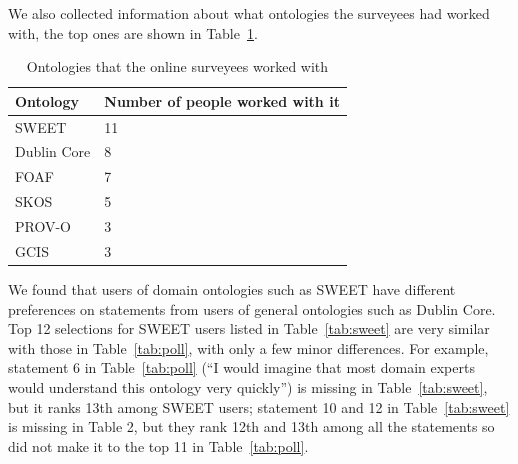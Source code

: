 We also collected information about what ontologies the surveyees had worked with, the top ones are shown in Table~\ref{tab:ontologies}.
\begin{table}
	\centering
\caption{Ontologies that the online surveyees worked with}
\label{tab:ontologies}
\begin{tabular}{|l|l|}
	\hline Ontology & Number of people worked with it \\ 
	\hline SWEET & 11 \\ 
	\hline Dublin Core & 8 \\ 
	\hline FOAF & 7 \\ 
	\hline SKOS & 5 \\ 
	\hline PROV-O & 3 \\ 
	\hline GCIS & 3 \\ 
	\hline 
\end{tabular} 
\end{table}
We found that users of domain ontologies such as SWEET have different preferences on statements from users of general ontologies such as Dublin Core. Top 12 selections for SWEET users listed in Table~\ref{tab:sweet} are very similar with those in Table~\ref{tab:poll}, with only a few minor differences. For example, statement 6 in Table~\ref{tab:poll} (``I would imagine that most domain experts would understand this ontology very quickly'') is missing in Table~\ref{tab:sweet}, but it ranks 13th among SWEET users; statement 10 and 12 in Table~\ref{tab:sweet} is missing in Table 2, but they rank 12th and 13th among all the statements so did not make it to the top 11 in Table~\ref{tab:poll}.
